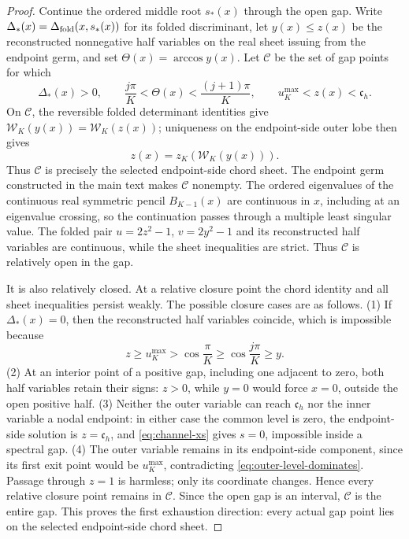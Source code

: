 \documentclass[a4paper,preprint,12pt,nopreprintline,sort&compress]{elsarticle}
\numberwithin{equation}{section}
\theoremstyle{remark}
\begin{document}
\begin{proof}
Continue the ordered middle root \(s_*(x)\) through the open gap.  Write
\(\Delta_*(x)=\Delta_{\rm fold}(x,s_*(x))\) for its folded discriminant,
let \(y(x)\leq z(x)\) be the reconstructed nonnegative half variables on
the real sheet issuing from the endpoint germ, and set
\(\Theta(x)=\arccos y(x)\).  Let \(\mathcal C\) be the set of gap points for
which
\[
 \Delta_*(x)>0,\qquad
 \frac{j\pi}{K}<\Theta(x)<\frac{(j+1)\pi}{K},\qquad
 u_K^{\max}<z(x)<\mathfrak c_h.
\]
On \(\mathcal C\), the reversible folded determinant identities give
\(\mathcal W_K(y(x))=\mathcal W_K(z(x))\); uniqueness on the endpoint-side
outer lobe then gives
\[
 z(x)=z_K(\mathcal W_K(y(x))).
\]
Thus \(\mathcal C\) is precisely the selected endpoint-side chord sheet.
The endpoint germ constructed in the main text makes \(\mathcal C\)
nonempty.  The ordered eigenvalues of the continuous real symmetric pencil
\(B_{K-1}(x)\) are continuous in \(x\), including at an eigenvalue crossing,
so the continuation passes through a multiple least singular value.  The
folded pair \(u=2z^2-1\), \(v=2y^2-1\) and its reconstructed half variables
are continuous, while the sheet inequalities are strict.  Thus
\(\mathcal C\) is relatively open in the gap.

It is also relatively closed.  At a relative closure point the chord
identity and all sheet inequalities persist weakly.  The possible closure
cases are as follows.  (1) If \(\Delta_*(x)=0\), then the reconstructed half
variables coincide, which is impossible because
\[
 z\geq u_K^{\max}>\cos\frac{\pi}{K}
 \geq\cos\frac{j\pi}{K}\geq y.
\]
(2) At an interior point of a positive gap, including one adjacent to zero,
both half variables retain their signs: \(z>0\), while \(y=0\) would force
\(x=0\), outside the open positive half.  (3) Neither the outer variable can
reach \(\mathfrak c_h\) nor the inner variable a nodal endpoint: in either
case the common level is zero, the endpoint-side solution is
\(z=\mathfrak c_h\), and \eqref{eq:channel-xs} gives \(s=0\), impossible
inside a spectral gap.  (4) The
outer variable remains in its endpoint-side component, since its first exit
point would be \(u_K^{\max}\), contradicting
\eqref{eq:outer-level-dominates}.  Passage through \(z=1\) is harmless; only
its coordinate changes.  Hence every relative closure point remains in
\(\mathcal C\).  Since the open gap is an interval, \(\mathcal C\) is the
entire gap.  This proves the first exhaustion direction: every actual gap
point lies on the selected endpoint-side chord sheet.


\end{proof}
\end{document}
